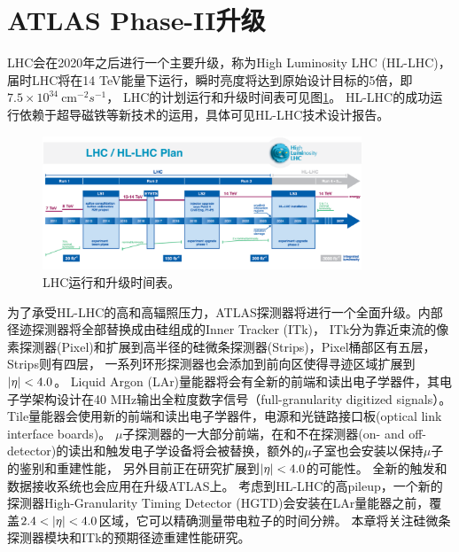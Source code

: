 \section{ATLAS Phase-II升级}
LHC会在2020年之后进行一个主要升级，称为High Luminosity LHC (HL-LHC)，届时LHC将在14 TeV能量下运行，瞬时亮度将达到原始设计目标的5倍，即$7.5\times10^{34}~\text{cm}^{-2}s^{-1}$，
LHC的计划运行和升级时间表可见图\ref{fig:LHC_timeline}。
HL-LHC的成功运行依赖于超导磁铁等新技术的运用，具体可见HL-LHC技术设计报告\cite{Apollinari:2284929}。
\begin{figure}[h]
\centering
 \includegraphics[width=0.85\textwidth]{fig/HL-LHC-PLAN.png}
 \caption{LHC运行和升级时间表\cite{Apollinari:2284929}。}
 \label{fig:LHC_timeline}
\end{figure}
为了承受HL-LHC的高\pileup 和高辐照压力，ATLAS探测器将进行一个全面升级。内部径迹探测器将全部替换成由硅组成的Inner Tracker (ITk)，
ITk分为靠近束流的像素探测器(Pixel)\cite{Collaboration:2285585}和扩展到高半径的硅微条探测器(Strips)\cite{Collaboration:2017mtb}，Pixel桶部区有五层，Strips则有四层，
一系列环形探测器也会添加到前向区使得寻迹区域扩展到$|\eta|<4.0$。
Liquid Argon (LAr)量能器\cite{Collaboration:2285582}将会有全新的前端和读出电子学器件，其电子学架构设计在40 MHz输出全粒度数字信号（full-granularity digitized signals）。
Tile量能器\cite{Collaboration:2285583}会使用新的前端和读出电子学器件，电源和光链路接口板(optical link interface boards)。
$\mu$子探测器\cite{Collaboration:2285580}的一大部分前端，在和不在探测器(on- and off-detector)的读出和触发电子学设备将会被替换，额外的$\mu$子室也会安装以保持$\mu$子的鉴别和重建性能，
另外目前正在研究扩展到$|\eta|<4.0$的可能性。
全新的触发和数据接收系统\cite{Collaboration:2285584}也会应用在升级ATLAS上。
考虑到HL-LHC的高pileup，一个新的探测器High-Granularity Timing Detector (HGTD)\cite{Collaboration:2623663}会安装在LAr量能器之前，覆盖$2.4<\abseta<4.0$区域，它可以精确测量带电粒子的时间分辨。
本章将关注硅微条探测器模块和ITk的预期径迹重建性能研究。

